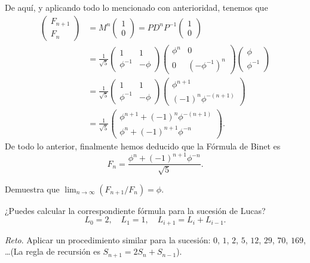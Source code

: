 De aquí, y aplicando todo lo mencionado con anterioridad, tenemos que
\begin{align*}
  \begin{pmatrix} F_{n+1} \\ F_n \end{pmatrix}
    &= M^n \begin{pmatrix} 1 \\ 0 \end{pmatrix}  = P D^n P^{-1} \begin{pmatrix} 1 \\ 0 \end{pmatrix} \\
    &= \frac{1}{\sqrt{5}} \begin{pmatrix} 1 & 1 \\ \phi^{-1} & -\phi \end{pmatrix}
        \begin{pmatrix} \phi^n & 0 \\ 0 & (-\phi^{-1})^n \end{pmatrix}
        \begin{pmatrix} \phi \\ \phi^{-1} \end{pmatrix} \\
    &= \frac{1}{\sqrt{5}} \begin{pmatrix} 1 & 1 \\ \phi^{-1} & -\phi \end{pmatrix}
        \begin{pmatrix} \phi^{n+1} \\ (-1)^n \phi^{-(n+1)} \end{pmatrix} \\
    &= \frac{1}{\sqrt{5}} \begin{pmatrix}
          \phi^{n+1} + (-1)^n \phi^{-(n+1)} \\
          \phi^n + (-1)^{n+1} \phi^{-n}
        \end{pmatrix}.
\end{align*}
De todo lo anterior, finalmente hemos deducido que la Fórmula de Binet es
\[
  F_n = \frac{\phi^n + (-1)^{n+1} \phi^{-n} }{\sqrt{5}}.
\]

\ExerciseSection

\begin{exerciselist}
  \item Demuestra que $\lim_{n\to\infty} (F_{n+1}/F_n) = \phi$.
  
  \item ¿Puedes calcular la correspondiente fórmula para la sucesión de Lucas?
  \[
    L_0 = 2, \quad L_1 = 1, \quad L_{i+1} = L_i + L_{i-1}.
  \]

  \item \emph{Reto}. Aplicar un procedimiento similar para la sucesión: $0$, $1$, $2$, $5$, $12$, $29$, $70$, $169$, \dots (La regla de recursión es $S_{n+1} = 2S_{n} + S_{n-1}$).
\end{exerciselist}